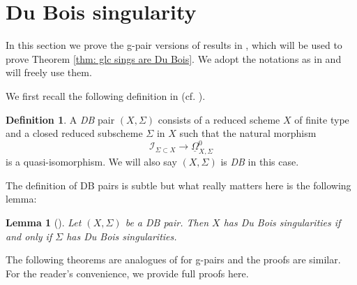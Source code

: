 \documentclass[11pt]{amsart}
\numberwithin{equation}{section}
\newtheorem{lem}[thm]{Lemma}
\theoremstyle{definition}
\newtheorem{defn}[thm]{Definition}
\theoremstyle{definition}
\theoremstyle{definition}
\begin{document}
\section{Du Bois singularity}\label{sec: DB singularity}
In this section we prove the g-pair versions of results in
\cite[Chapter 6]{Kol13}, which will be used to prove Theorem
\ref{thm: glc sings are Du Bois}. We adopt the notations as in
\cite[Chapter 6]{Kol13} and will freely use them.

We first recall the following definition in \cite{Kov11} (cf.
\cite[Definition 6.10]{Kol13}).

\begin{defn}
  A \emph{DB} pair $(X,\Sigma)$ consists of a reduced scheme $X$ of
  finite type and a closed reduced subscheme $\Sigma$ in $X$ such
  that the natural morphism
  $$
  \mathcal{I}_{\Sigma\subset X}\to \underline{\Omega}_{X,\Sigma}^0
  $$
  is a quasi-isomorphism. We will also say $(X,\Sigma)$ is \emph{DB}
  in this case.
\end{defn}

The definition of DB pairs is subtle but what really matters here is
the following lemma:

\begin{lem}[{\cite[Proposition 6.15]{Kol13}}]\label{lem: property of DB pairs}
  Let $(X,\Sigma)$ be a DB pair. Then $X$ has Du Bois singularities
  if and only if $\Sigma$ has Du Bois singularities.
\end{lem}

The following theorems are analogues of \cite[Theorems 6.31,
6.33]{Kol13} for g-pairs and the proofs are similar. For the reader's
convenience, we provide full proofs here.
\end{document}
